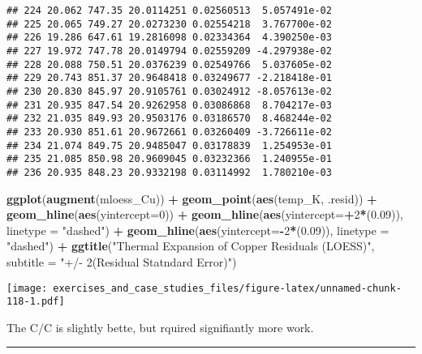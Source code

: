 \documentclass[]{book}
\newenvironment{Shaded}{\begin{snugshade}}{\end{snugshade}}
\newcommand{\DataTypeTok}[1]{\textcolor[rgb]{0.13,0.29,0.53}{#1}}
\newcommand{\DecValTok}[1]{\textcolor[rgb]{0.00,0.00,0.81}{#1}}
\newcommand{\FloatTok}[1]{\textcolor[rgb]{0.00,0.00,0.81}{#1}}
\newcommand{\KeywordTok}[1]{\textcolor[rgb]{0.13,0.29,0.53}{\textbf{#1}}}
\newcommand{\NormalTok}[1]{#1}
\newcommand{\OperatorTok}[1]{\textcolor[rgb]{0.81,0.36,0.00}{\textbf{#1}}}
\newcommand{\StringTok}[1]{\textcolor[rgb]{0.31,0.60,0.02}{#1}}
\theoremstyle{definition}
\theoremstyle{definition}
\theoremstyle{definition}
\theoremstyle{remark}
\begin{document}
\begin{verbatim}
## 224 20.062 747.35 20.0114251 0.02560513  5.057491e-02
## 225 20.065 749.27 20.0273230 0.02554218  3.767700e-02
## 226 19.286 647.61 19.2816098 0.02334364  4.390250e-03
## 227 19.972 747.78 20.0149794 0.02559209 -4.297938e-02
## 228 20.088 750.51 20.0376239 0.02549766  5.037605e-02
## 229 20.743 851.37 20.9648418 0.03249677 -2.218418e-01
## 230 20.830 845.97 20.9105761 0.03024912 -8.057613e-02
## 231 20.935 847.54 20.9262958 0.03086868  8.704217e-03
## 232 21.035 849.93 20.9503176 0.03186570  8.468244e-02
## 233 20.930 851.61 20.9672661 0.03260409 -3.726611e-02
## 234 21.074 849.75 20.9485047 0.03178839  1.254953e-01
## 235 21.085 850.98 20.9609045 0.03232366  1.240955e-01
## 236 20.935 848.23 20.9332198 0.03114992  1.780210e-03
\end{verbatim}

\begin{Shaded}
\begin{Highlighting}[]
\KeywordTok{ggplot}\NormalTok{(}\KeywordTok{augment}\NormalTok{(mloess_Cu)) }\OperatorTok{+}
\StringTok{  }\KeywordTok{geom_point}\NormalTok{(}\KeywordTok{aes}\NormalTok{(temp_K, .resid)) }\OperatorTok{+}
\StringTok{  }\KeywordTok{geom_hline}\NormalTok{(}\KeywordTok{aes}\NormalTok{(}\DataTypeTok{yintercept=}\DecValTok{0}\NormalTok{)) }\OperatorTok{+}
\StringTok{  }\KeywordTok{geom_hline}\NormalTok{(}\KeywordTok{aes}\NormalTok{(}\DataTypeTok{yintercept=}\OperatorTok{+}\DecValTok{2}\OperatorTok{*}\NormalTok{(}\FloatTok{0.09}\NormalTok{)), }\DataTypeTok{linetype =} \StringTok{"dashed"}\NormalTok{) }\OperatorTok{+}
\StringTok{  }\KeywordTok{geom_hline}\NormalTok{(}\KeywordTok{aes}\NormalTok{(}\DataTypeTok{yintercept=}\OperatorTok{-}\DecValTok{2}\OperatorTok{*}\NormalTok{(}\FloatTok{0.09}\NormalTok{)), }\DataTypeTok{linetype =} \StringTok{"dashed"}\NormalTok{) }\OperatorTok{+}
\StringTok{  }\KeywordTok{ggtitle}\NormalTok{(}\StringTok{"Thermal Expansion of Copper Residuals (LOESS)"}\NormalTok{, }\DataTypeTok{subtitle =} \StringTok{"+/- 2(Residual Statndard Error)"}\NormalTok{)}
\end{Highlighting}
\end{Shaded}

\texttt{[image: exercises\_and\_case\_studies\_files/figure-latex/unnamed-chunk-118-1.pdf]}

The C/C is slightly bette, but rquired signifiantly more work.

\begin{center}\rule{0.5\linewidth}{\linethickness}\end{center}
\end{document}
